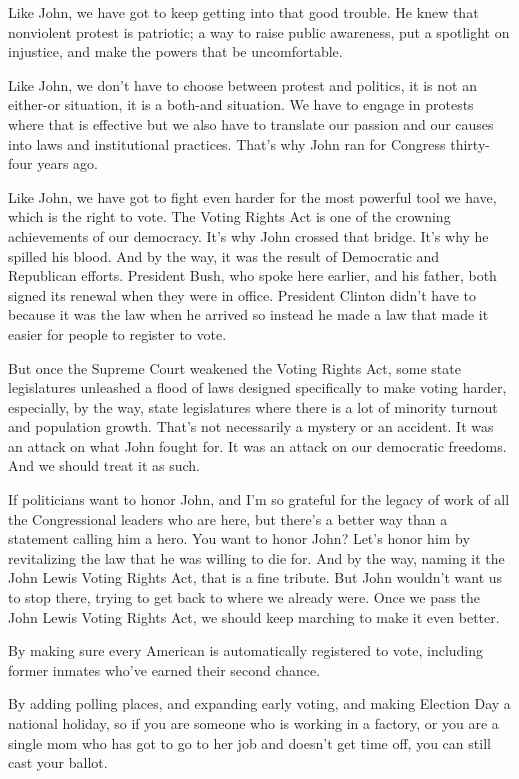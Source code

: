 Like John, we have got to keep getting into that good trouble. He knew
that nonviolent protest is patriotic; a way to raise public awareness,
put a spotlight on injustice, and make the powers that be uncomfortable.

Like John, we don't have to choose between protest and politics, it is
not an either-or situation, it is a both-and situation. We have to
engage in protests where that is effective but we also have to translate
our passion and our causes into laws and institutional practices. That's
why John ran for Congress thirty-four years ago.

Like John, we have got to fight even harder for the most powerful tool
we have, which is the right to vote. The Voting Rights Act is one of the
crowning achievements of our democracy. It's why John crossed that
bridge. It's why he spilled his blood. And by the way, it was the result
of Democratic and Republican efforts. President Bush, who spoke here
earlier, and his father, both signed its renewal when they were in
office. President Clinton didn't have to because it was the law when he
arrived so instead he made a law that made it easier for people to
register to vote.

But once the Supreme Court weakened the Voting Rights Act, some state
legislatures unleashed a flood of laws designed specifically to make
voting harder, especially, by the way, state legislatures where there is
a lot of minority turnout and population growth. That's not necessarily
a mystery or an accident. It was an attack on what John fought for. It
was an attack on our democratic freedoms. And we should treat it as
such.

If politicians want to honor John, and I'm so grateful for the legacy of
work of all the Congressional leaders who are here, but there's a better
way than a statement calling him a hero. You want to honor John? Let's
honor him by revitalizing the law that he was willing to die for. And by
the way, naming it the John Lewis Voting Rights Act, that is a fine
tribute. But John wouldn't want us to stop there, trying to get back to
where we already were. Once we pass the John Lewis Voting Rights Act, we
should keep marching to make it even better.

By making sure every American is automatically registered to vote,
including former inmates who've earned their second chance.

By adding polling places, and expanding early voting, and making
Election Day a national holiday, so if you are someone who is working in
a factory, or you are a single mom who has got to go to her job and
doesn't get time off, you can still cast your ballot.

